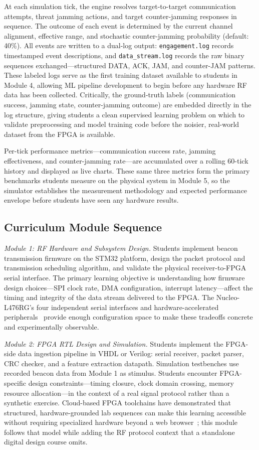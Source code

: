 \documentclass[conference]{IEEEtran}
\begin{document}
At each simulation tick, the engine resolves target-to-target communication attempts, threat jamming actions, and target counter-jamming responses in sequence. The outcome of each event is determined by the current channel alignment, effective range, and stochastic counter-jamming probability (default: 40\%). All events are written to a dual-log output: \texttt{engagement.log} records timestamped event descriptions, and \texttt{data\_stream.log} records the raw binary sequences exchanged---structured DATA, ACK, JAM, and counter-JAM patterns. These labeled logs serve as the first training dataset available to students in Module 4, allowing ML pipeline development to begin before any hardware RF data has been collected. Critically, the ground-truth labels (communication success, jamming state, counter-jamming outcome) are embedded directly in the log structure, giving students a clean supervised learning problem on which to validate preprocessing and model training code before the noisier, real-world dataset from the FPGA is available.

Per-tick performance metrics---communication success rate, jamming effectiveness, and counter-jamming rate---are accumulated over a rolling 60-tick history and displayed as live charts. These same three metrics form the primary benchmarks students measure on the physical system in Module 5, so the simulator establishes the measurement methodology and expected performance envelope before students have seen any hardware results.

\subsection{Curriculum Module Sequence}

\textit{Module 1: RF Hardware and Subsystem Design.} Students implement beacon transmission firmware on the STM32 platform, design the packet protocol and transmission scheduling algorithm, and validate the physical receiver-to-FPGA serial interface. The primary learning objective is understanding how firmware design choices---SPI clock rate, DMA configuration, interrupt latency---affect the timing and integrity of the data stream delivered to the FPGA\@. The Nucleo-L476RG's four independent serial interfaces and hardware-accelerated peripherals~\cite{b10} provide enough configuration space to make these tradeoffs concrete and experimentally observable.

\textit{Module 2: FPGA RTL Design and Simulation.} Students implement the FPGA-side data ingestion pipeline in VHDL or Verilog: serial receiver, packet parser, CRC checker, and a feature extraction datapath. Simulation testbenches use recorded beacon data from Module 1 as stimulus. Students encounter FPGA-specific design constraints---timing closure, clock domain crossing, memory resource allocation---in the context of a real signal protocol rather than a synthetic exercise. Cloud-based FPGA toolchains have demonstrated that structured, hardware-grounded lab sequences can make this learning accessible without requiring specialized hardware beyond a web browser~\cite{b9}; this module follows that model while adding the RF protocol context that a standalone digital design course omits.
\end{document}
